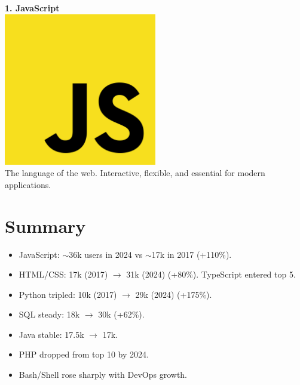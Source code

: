 \documentclass[12pt,a4paper]{article}
\begin{document}
\textbf{1. JavaScript} \\
\includegraphics[width=0.5\textwidth]{images/js.png} \\
The language of the web. Interactive, flexible, and essential for modern applications.

\section*{Summary}
\begin{itemize}
    \item JavaScript: $\sim$36k users in 2024 vs $\sim$17k in 2017 (+110\%).
    \item HTML/CSS: 17k (2017) $\to$ 31k (2024) (+80\%). TypeScript entered top 5.
    \item Python tripled: 10k (2017) $\to$ 29k (2024) (+175\%).
    \item SQL steady: 18k $\to$ 30k (+62\%).
    \item Java stable: 17.5k $\to$ 17k.
    \item PHP dropped from top 10 by 2024.
    \item Bash/Shell rose sharply with DevOps growth.
\end{itemize}
\end{document}
